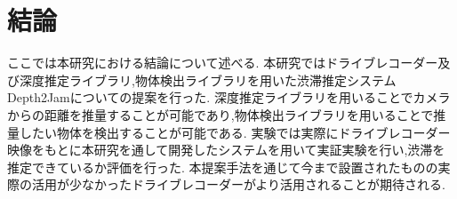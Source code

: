 \section{結論}
ここでは本研究における結論について述べる.
本研究ではドライブレコーダー及び深度推定ライブラリ,物体検出ライブラリを用いた渋滞推定システムDepth2Jamについての提案を行った.
深度推定ライブラリを用いることでカメラからの距離を推量することが可能であり,物体検出ライブラリを用いることで推量したい物体を検出することが可能である.
実験では実際にドライブレコーダー映像をもとに本研究を通して開発したシステムを用いて実証実験を行い,渋滞を推定できているか評価を行った.
本提案手法を通じて今まで設置されたものの実際の活用が少なかったドライブレコーダーがより活用されることが期待される.
